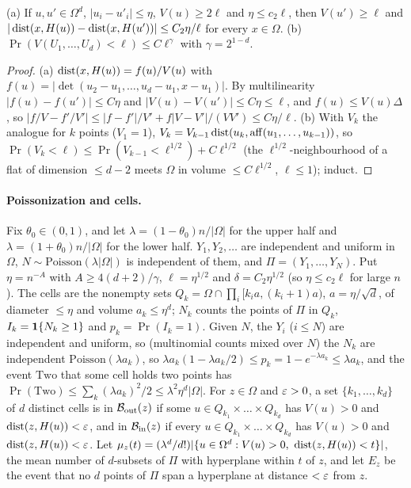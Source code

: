 \begin{lemma}[Perturbation]\label{lem:C-pert}
(a) If $u, u' \in \Omega^d$, $|u_i - u'_i| \le \eta$, $V(u) \ge 2\ell$ and $\eta \le c_2\ell$, then $V(u') \ge \ell$ and
$|\operatorname{dist}(x, H(u)) - \operatorname{dist}(x, H(u'))| \le C_2\eta/\ell$ for every $x \in \Omega$. (b) $\Pr(V(U_1, \dots, U_d) < \ell) \le C\ell^\gamma$
with $\gamma = 2^{1-d}$.
\end{lemma}

\begin{proof}
(a) $\operatorname{dist}(x, H(u)) = f(u)/V(u)$ with $f(u) = |\det(u_2 - u_1, \dots, u_d - u_1, x - u_1)|$. By multilinearity
$|f(u) - f(u')| \le C\eta$ and $|V(u) - V(u')| \le C\eta \le \ell$, and $f(u) \le V(u)\Delta$, so
$|f/V - f'/V'| \le |f - f'|/V' + f|V - V'|/(VV') \le C\eta/\ell$. (b) With $V_k$ the analogue for $k$ points ($V_1 = 1$),
$V_k = V_{k-1}\operatorname{dist}(u_k, \operatorname{aff}(u_1, \dots, u_{k-1}))$, so $\Pr(V_k < \ell) \le \Pr(V_{k-1} < \ell^{1/2}) + C\ell^{1/2}$ (the
$\ell^{1/2}$-neighbourhood of a flat of dimension $\le d - 2$ meets $\Omega$ in volume $\le C\ell^{1/2}$, $\ell \le 1$); induct.
\end{proof}

\paragraph{Poissonization and cells.} Fix $\theta_0 \in (0, 1)$, and let $\lambda = (1 - \theta_0)n/|\Omega|$ for the upper half
and $\lambda = (1 + \theta_0)n/|\Omega|$ for the lower half. $Y_1, Y_2, \dots$ are independent and uniform in $\Omega$,
$N \sim \mathrm{Poisson}(\lambda|\Omega|)$ is independent of them, and $\Pi = (Y_1, \dots, Y_N)$. Put $\eta = n^{-A}$ with
$A \ge 4(d + 2)/\gamma$, $\ell = \eta^{1/2}$ and $\delta = C_2\eta^{1/2}$ (so $\eta \le c_2\ell$ for large $n$). The cells are the
nonempty sets $Q_k = \Omega \cap \prod_i[k_ia, (k_i + 1)a)$, $a = \eta/\sqrt d$, of diameter $\le \eta$ and volume $a_k \le \eta^d$;
$N_k$ counts the points of $\Pi$ in $Q_k$, $I_k = \mathbf{1}\{N_k \ge 1\}$ and $p_k = \Pr(I_k = 1)$. Given $N$, the $Y_i$ ($i \le N$) are
independent and uniform, so (multinomial counts mixed over $N$) the $N_k$ are independent $\mathrm{Poisson}(\lambda a_k)$, so $\lambda a_k(1 - \lambda a_k/2) \le p_k = 1 - e^{-\lambda a_k} \le \lambda a_k$, and the event $\mathrm{Two}$ that some cell
holds two points has $\Pr(\mathrm{Two}) \le \sum_k(\lambda a_k)^2/2 \le \lambda^2\eta^d|\Omega|$.
For $z \in \Omega$ and $\varepsilon > 0$, a set $\{k_1, \dots, k_d\}$ of $d$ distinct cells is in $\mathcal{B}_{\mathrm{out}}(z)$ if some
$u \in Q_{k_1} \times \dots \times Q_{k_d}$ has $V(u) > 0$ and $\operatorname{dist}(z, H(u)) < \varepsilon$, and in $\mathcal{B}_{\mathrm{in}}(z)$ if every $u \in Q_{k_1} \times \dots \times Q_{k_d}$ has $V(u) > 0$ and $\operatorname{dist}(z, H(u)) < \varepsilon$.
Let $\mu_z(t) = (\lambda^d/d!)|\{u \in \Omega^d : V(u) > 0,\ \operatorname{dist}(z, H(u)) < t\}|$, the mean number of $d$-subsets of $\Pi$
with hyperplane within $t$ of $z$, and let $E_z$ be the event that no $d$ points of $\Pi$ span a hyperplane at
distance $< \varepsilon$ from $z$.

